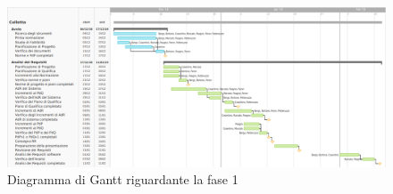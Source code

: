 \begin{figure}[h]
	\centering
	\includegraphics[scale=0.33]{images/ganttan.png}
	\caption{Diagramma di Gantt riguardante la fase 1}
\end{figure}